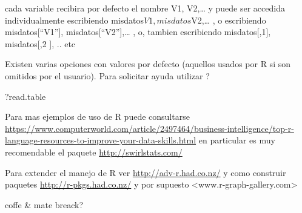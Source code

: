\documentclass[ignorenonframetext,]{beamer}
\newenvironment{Shaded}{\begin{snugshade}}{\end{snugshade}}
\newcommand{\NormalTok}[1]{#1}
\begin{document}
\begin{frame}[fragile]

cada variable recibira por defecto el nombre V1, V2,\ldots{} y puede ser
accedida individualmente escribiendo misdatos\(V1, misdatos\)V2,\ldots{}
, o escribiendo misdatos{[}``V1''{]}, misdatos{[}``V2''{]},\ldots{} , o,
tambien escribiendo misdatos{[},1{]}, misdatos{[},2 {]}, .. etc

Existen varias opciones con valores por defecto (aquellos usados por R
si son omitidos por el usuario). Para solicitar ayuda utilizar ?

\begin{Shaded}
\begin{Highlighting}[]
\NormalTok{?read.table}
\end{Highlighting}
\end{Shaded}

Para mas ejemplos de uso de R puede consultarse
\url{https://www.computerworld.com/article/2497464/business-intelligence/top-r-language-resources-to-improve-your-data-skills.html}
en particular es muy recomendable el paquete
\url{http://swirlstats.com/}

Para extender el manejo de R ver \url{http://adv-r.had.co.nz/} y como
construir paquetes \url{http://r-pkgs.had.co.nz/} y por supuesto
\textless{}www.r-graph-gallery.com\textgreater{}

\end{frame}

\begin{frame}{coffe \& mate breack?}

\end{frame}
\end{document}
